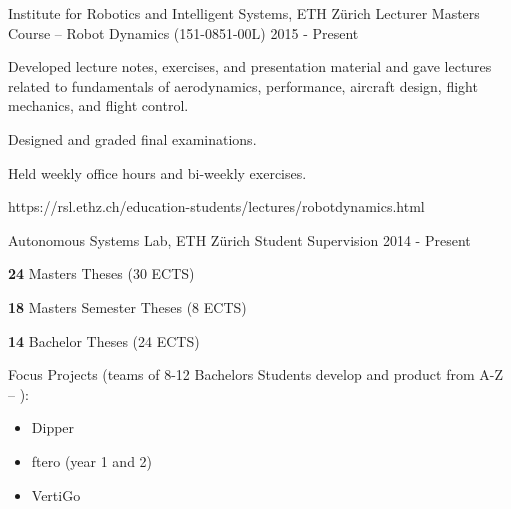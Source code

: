 \label{sec:teaching}
\begin{cventries}


\cvteachentry
  	{Institute for Robotics and Intelligent Systems, ETH Z\"{u}rich} %
  	{Lecturer} %
    {Masters Course -- Robot Dynamics (151-0851-00L)} %
    {2015 - Present} %
    {
      \begin{cvitems} %
        \item Developed lecture notes, exercises, and presentation material and gave lectures related to fundamentals of aerodynamics, performance, aircraft design, flight mechanics, and flight control.
		\item Designed and graded final examinations.
		\item Held weekly office hours and bi-weekly exercises.
      \end{cvitems}
    } %
    {https://rsl.ethz.ch/education-students/lectures/robotdynamics.html} %
    {\showteachingdescriptions}

\cvteachentry
  	{Autonomous Systems Lab, ETH Z\"{u}rich} %
  	{Student Supervision} %
    {} %
    {2014 - Present} %
    {
      \begin{cvitems} %
        \item \textbf{24} Masters Theses (30 ECTS)
		\item \textbf{18} Masters Semester Theses (8 ECTS)
		\item \textbf{14} Bachelor Theses (24 ECTS)
		\item Focus Projects (teams of 8-12 Bachelors Students develop and product from A-Z -- ):
		\begin{itemize}[label=-]
			\item Dipper 
			\item ftero (year 1 and 2) 
			\item VertiGo 	
		\end{itemize}
      \end{cvitems}
    } %
    {} %
    {\showprojectdescriptions}
    

\end{cventries}
